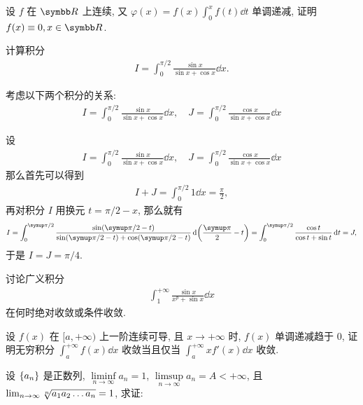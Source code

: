 \begin{exercise}[series=exer]
    \item 设 $ f $ 在 $ \R $ 上连续, 又 $ \varphi(x) = f(x)\int_{0}^{x} f(t) \dd{t} $ 单调递减, 证明 $ f(x) \equiv 0, x\in\R $.
    \item 计算积分
    \begin{align*}
        I = \int_{0}^{\pi/2} \frac{\sin x}{\sin x + \cos x} \dd{x}.
    \end{align*}
    \begin{hint}
        考虑以下两个积分的关系:
        \begin{align*}
            I = \int_{0}^{\pi/2} \frac{\sin x}{\sin x + \cos x} \dd{x}, \quad J = \int_{0}^{\pi/2} \frac{\cos x}{\sin x + \cos x} \dd{x}
        \end{align*}
    \end{hint}
    \begin{answer}
        设 
        \begin{align*}
            I = \int_{0}^{\pi/2} \frac{\sin x}{\sin x + \cos x} \dd{x}, \quad J = \int_{0}^{\pi/2} \frac{\cos x}{\sin x + \cos x} \dd{x}
        \end{align*}
        那么首先可以得到 
        \begin{align*}
            I + J = \int_{0}^{\pi/2} 1\dd{x} = \frac{\pi}{2},
        \end{align*}
        再对积分 $ I $ 用换元 $ t = \pi/2 - x $, 那么就有
        \begin{align*}
            I = \int_{0}^{\pi/2} \frac{\sin(\pi/2 - t)}{\sin(\pi/2 - t) + \cos(\pi/2 - t)} \dd{\qty(\frac{\pi}{2} - t)} = \int_{0}^{\pi/2} \frac{\cos t}{\cos t + \sin t} \dd{t} = J,
        \end{align*}
        于是 $ I = J = \pi/4 $. 
    \end{answer}
    \item 讨论广义积分
    \begin{align*}
        \int_{1}^{+\infty} \frac{\sin x}{x^{p} + \sin x} \dd{x}
    \end{align*}
    在何时绝对收敛或条件收敛.
    \item 设 $ f(x) $ 在 $ [a, +\infty) $ 上一阶连续可导, 且 $ x \to +\infty $ 时, $ f(x) $ 单调递减趋于 $ 0 $, 证明无穷积分 $ \int_{a}^{+\infty} f(x) \dd{x} $ 收敛当且仅当 $ \int_{a}^{+\infty} xf'(x) \dd{x} $ 收敛. 
    \item 设 $ \qty{a_{n}} $ 是正数列, $ \liminf\limits_{n\to\infty} a_{n} = 1 $, $ \limsup\limits_{n\to\infty} a_{n} = A < +\infty $, 且 $ \lim_{n \to \infty} \sqrt[n]{a_{1}a_{2}\dots a_{n}} = 1 $, 求证:
    \begin{align*}

\end{align*}
\end{exercise}
